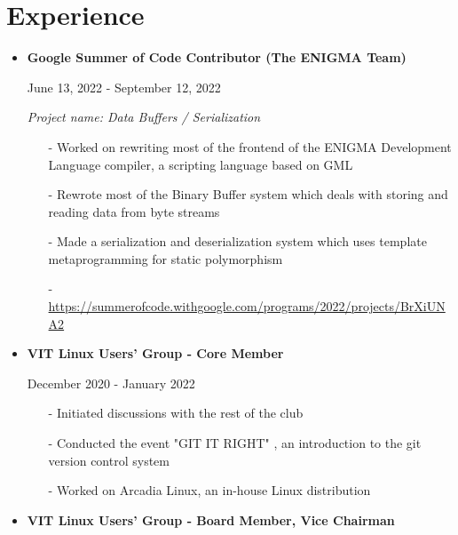 \documentclass[12pt]{article}
\newcommand{\primarycolor}{red}
\newcommand{\mysection}[1]{\section{#1}\vspace{-1.2ex}}
\begin{document}
    \mysection{Experience}
    {
        \begin{itemize}
            \item
                \textbf{Google Summer of Code Contributor (The ENIGMA Team)}

                {\color{\primarycolor}June 13, 2022 - September 12, 2022}

                \textit{Project name: Data Buffers / Serialization}
                \vspace{-1ex}
                \begin{itemize}[itemsep=1ex, leftmargin=3.5ex]
                    \item[-] Worked on rewriting most of the frontend of the ENIGMA Development Language compiler, a scripting language based on GML
                    \item[-] Rewrote most of the Binary Buffer system which deals with storing and reading data from byte streams
                    \item[-] Made a serialization and deserialization system which uses template metaprogramming for static polymorphism
                    \item[-] \url{https://summerofcode.withgoogle.com/programs/2022/projects/BrXiUNA2}
                \end{itemize}

            \item
                \textbf{VIT Linux Users' Group - Core Member}

                {\color{\primarycolor}December 2020 - January 2022}
                \vspace{-1ex}
                \begin{itemize}[itemsep=1ex, leftmargin=3.5ex]
                    \item[-] Initiated discussions with the rest of the club
                    \item[-] Conducted the event "GIT IT RIGHT" , an introduction to the git version control system
                    \item[-] Worked on Arcadia Linux, an in-house Linux distribution
                \end{itemize}

            \item
                \textbf{VIT Linux Users' Group - Board Member, Vice Chairman}


\end{itemize}}
\end{document}
